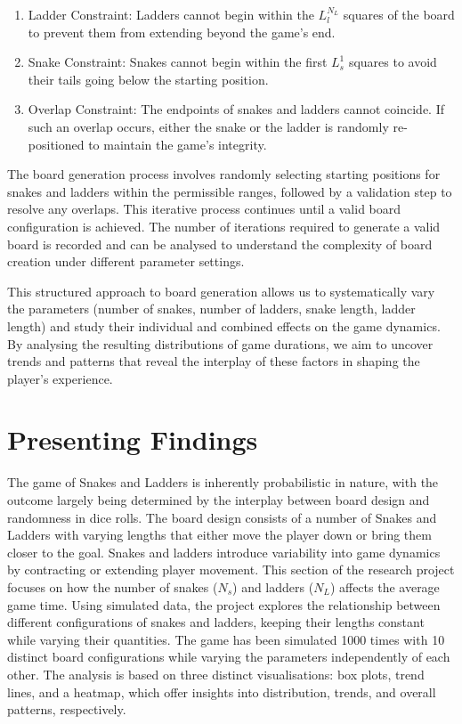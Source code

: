\documentclass[12pt]{report}
\begin{document}
	\begin{enumerate}
		\item Ladder Constraint: Ladders cannot begin within the $L^{N_{L}}_{l}$ squares of the board to prevent them from extending beyond the game's end.
		\item Snake Constraint: Snakes cannot begin within the first $L^{1}_{s}$ squares to avoid their tails going below the starting position.
		\item Overlap Constraint: The endpoints of snakes and ladders cannot coincide. If such an overlap occurs, either the snake or the ladder is randomly re-positioned to maintain the game's integrity.
	\end{enumerate}
	
	The board generation process involves randomly selecting starting positions for snakes and ladders within the permissible ranges, followed by a validation step to resolve any overlaps. This iterative process continues until a valid board configuration is achieved. The number of iterations required to generate a valid board is recorded and can be analysed to understand the complexity of board creation under different parameter settings.
	
	This structured approach to board generation allows us to systematically vary the parameters (number of snakes, number of ladders, snake length, ladder length) and study their individual and combined effects on the game dynamics. By analysing the resulting distributions of game durations, we aim to uncover trends and patterns that reveal the interplay of these factors in shaping the player's experience.
	
	\section{Presenting Findings}
	The game of Snakes and Ladders is inherently probabilistic in nature, with the outcome largely being determined by the interplay between board design and randomness in dice rolls. The board design consists of a number of Snakes and Ladders with varying lengths that either move the player down or bring them closer to the goal. Snakes and ladders introduce variability into game dynamics by contracting or extending player movement. This section of the research project focuses on how the number of snakes ($N_{s}$) and ladders ($N_{L}$) affects the average game time. Using simulated data, the project explores the relationship between different configurations of snakes and ladders, keeping their lengths constant while varying their quantities. The game has been simulated 1000 times with 10 distinct board configurations while varying the parameters independently of each other. The analysis is based on three distinct visualisations: box plots, trend lines, and a heatmap, which offer insights into distribution, trends, and overall patterns, respectively.
	
\end{document}
